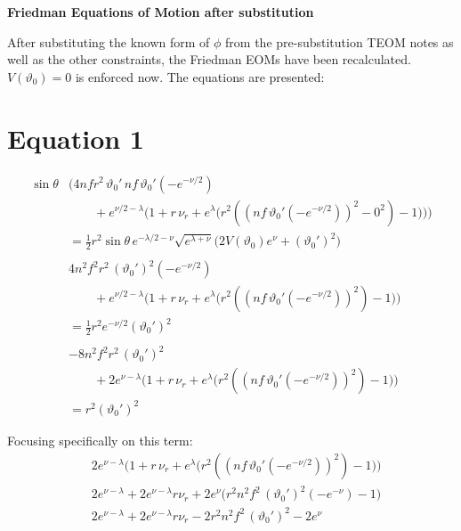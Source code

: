 \documentclass[12pt]{article}
\begin{document}
\begin{center}
  \Large\textbf{Friedman Equations of Motion after substitution} \\
  \large{}
\end{center}

After substituting the known form of $\phi$ from the pre-substitution TEOM notes as well as the other constraints, the Friedman EOMs have been recalculated. $V(\vartheta_0)=0$ is enforced now. The equations are presented:

\section*{Equation 1}

\begin{align*}
\sin\theta &\Big(
  4 n f r^2 \, \vartheta_0' 
  \, n f \, \vartheta_0' (- e^{-\nu/2}) \\
  & \qquad + e^{\nu/2 - \lambda} \Big(
      1 + r \, \nu_r + e^{\lambda} \big( r^2 ((n f \, \vartheta_0' (- e^{-\nu/2}))^2 - 0^2) - 1 \big)
    \Big)
\Big) \\
& = \frac{1}{2} r^2 \sin\theta \, e^{-\lambda/2 - \nu} \sqrt{e^{\lambda+\nu}} \Big( 2 V(\vartheta_0) e^{\nu} + (\vartheta_0')^2 \Big)  \\  \\
&4 n^2 f^2 r^2
  \, (\vartheta_0')^2 (- e^{-\nu/2})  \\
  & \qquad + e^{\nu/2 - \lambda} \Big(
      1 + r \, \nu_r + e^{\lambda} \big( r^2 ((n f \, \vartheta_0' (- e^{-\nu/2}))^2) - 1 \big)
    \Big) \\
& = \frac{1}{2} r^2 e^{-\nu/2} (\vartheta_0')^2  \\  \\
&-8 n^2 f^2 r^2
  \, (\vartheta_0')^2 \\
  & \qquad + 2e^{\nu - \lambda} \Big(
      1 + r \, \nu_r + e^{\lambda} \big( r^2 ((n f \, \vartheta_0' (- e^{-\nu/2}))^2) - 1 \big)
    \Big) \\
& = r^2 (\vartheta_0')^2 
\end{align*}

Focusing specifically on this term:
\begin{align*}
  &2e^{\nu - \lambda} \Big(
      1 + r \, \nu_r + e^{\lambda} \big( r^2 ((n f \, \vartheta_0' (- e^{-\nu/2}))^2) - 1 \big)
    \Big) \\
  &2e^{\nu - \lambda} + 2e^{\nu - \lambda}r \nu_r + 2e^{\nu} \big( r^2 n^2 f^2 \, (\vartheta_0')^2 (- e^{-\nu}) - 1 \big) \\
  &2e^{\nu - \lambda} + 2e^{\nu - \lambda}r \nu_r - 2 r^2 n^2 f^2 \, (\vartheta_0')^2 - 2e^{\nu}
\end{align*}
\end{document}
